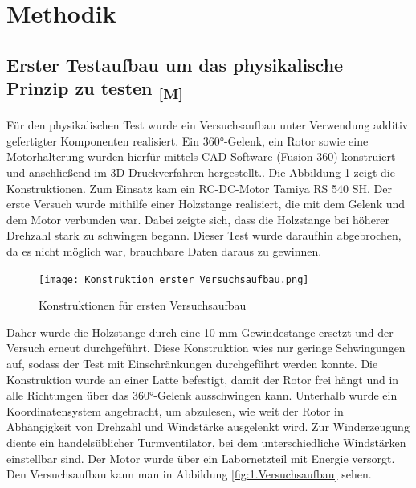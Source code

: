\documentclass[a4paper,12pt]{article}
\begin{document}
\section{Methodik}


\subsection{\texorpdfstring{Erster Testaufbau um das physikalische Prinzip zu testen \textsubscript{[M]}}{Erster Testaufbau um das physikalische Prinzip zu testen [M]}}

Für den physikalischen Test wurde ein Versuchsaufbau unter Verwendung additiv gefertigter Komponenten realisiert. Ein 360°-Gelenk, ein Rotor sowie eine Motorhalterung wurden hierfür mittels CAD-Software (Fusion 360) konstruiert und anschließend im 3D-Druckverfahren hergestellt.. Die Abbildung \ref{fig:Konstruktionen erster Versuchsaufbau} zeigt die Konstruktionen. Zum Einsatz kam ein RC-DC-Motor Tamiya RS 540 SH.\cite{Datenblatt_Brushed_Motor} \newline
Der erste Versuch wurde mithilfe einer Holzstange realisiert, die mit dem Gelenk und dem Motor verbunden war. Dabei zeigte sich, dass die Holzstange bei höherer Drehzahl stark zu schwingen begann. Dieser Test wurde daraufhin abgebrochen, da es nicht möglich war, brauchbare Daten daraus zu gewinnen.

\begin{figure}[H]
    \centering
    \texttt{[image: Konstruktion\_erster\_Versuchsaufbau.png]}
    \caption{Konstruktionen für ersten Versuchsaufbau}
    \label{fig:Konstruktionen erster Versuchsaufbau}
\end{figure}

Daher wurde die Holzstange durch eine 10-mm-Gewindestange ersetzt und der Versuch erneut durchgeführt. Diese Konstruktion wies nur geringe Schwingungen auf, sodass der Test mit Einschränkungen durchgeführt werden konnte.
Die Konstruktion wurde an einer Latte befestigt, damit der Rotor frei hängt und in alle Richtungen über das 360°-Gelenk ausschwingen kann. Unterhalb wurde ein Koordinatensystem angebracht, um abzulesen, wie weit der Rotor in Abhängigkeit von Drehzahl und Windstärke ausgelenkt wird.
Zur Winderzeugung diente ein handelsüblicher Turmventilator, bei dem unterschiedliche Windstärken einstellbar sind. Der Motor wurde über ein Labornetzteil mit Energie versorgt. Den Versuchsaufbau kann man in Abbildung \ref{fig:1.Versuchsaufbau} sehen.\newline
\end{document}

